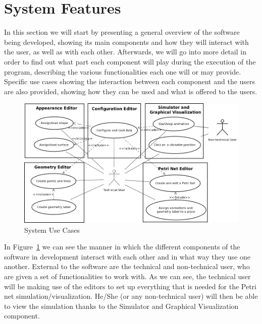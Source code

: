 \section{System Features}
\label{sec:system_features}

In this section we will start by presenting a general overview of the software being developed, 
showing its main components and how they will interact with the user, as well as with each other. 
Afterwards, we will go into more detail in order to find out what part each component will play 
during the execution of the program, describing the various functionalities each one will or may provide. 
Specific use cases showing the interaction between each component and the users are also provided, 
showing how they can be used and what is offered to the users.

\begin{figure}[htp]
\begin{center}
  \includegraphics[scale=0.5]{image/uc_general.png}
  \caption{System Use Cases}
  \label{fig:system_use_cases}
\end{center}
\end{figure}

In Figure~\ref{fig:system_use_cases} we can see the manner in which the different components of the software in
development interact with each other and in what way they use one another. External to the software are 
the technical and non-technical user, who are given a set of functionalities to work with. As we can see, 
the technical user will be making use of the editors to set up everything that is needed for the Petri net simulation/visualization. He/She (or any 
non-technical user) will then be able to view the simulation thanks to the Simulator and Graphical 
Visualization component.

